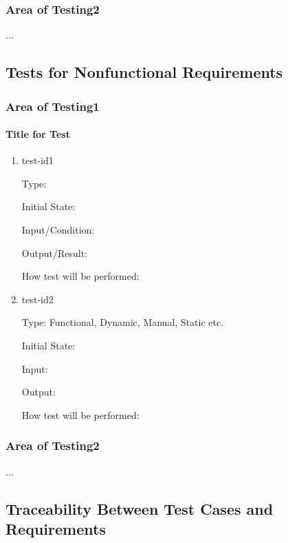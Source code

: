 \documentclass[12pt, titlepage]{article}
\begin{document}
\subsubsection{Area of Testing2}

...

\subsection{Tests for Nonfunctional Requirements}

\subsubsection{Area of Testing1}
		
\paragraph{Title for Test}

\begin{enumerate}

\item{test-id1\\}

Type: 
					
Initial State: 
					
Input/Condition: 
					
Output/Result: 
					
How test will be performed: 
					
\item{test-id2\\}

Type: Functional, Dynamic, Manual, Static etc.
					
Initial State: 
					
Input: 
					
Output: 
					
How test will be performed: 

\end{enumerate}

\subsubsection{Area of Testing2}

...

\subsection{Traceability Between Test Cases and Requirements}
\end{document}
